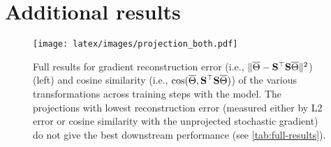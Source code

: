 \section{Additional results}
\begin{figure}[h]
    \centering
    \texttt{[image: latex/images/projection\_both.pdf]}
    \caption{Full results for gradient reconstruction error (i.e., $\Vert \overline{\Theta} - {\mathbf{S}}^\top {\mathbf{S}} \overline{\Theta}\Vert^2$) (left) and cosine similarity  (i.e., $\cos(\overline{\Theta}, {\mathbf{S}}^\top {\mathbf{S}} \overline{\Theta})$) of the various transformations across training steps with the \tinyB model. The projections with lowest reconstruction error (measured either by L2 error or cosine similarity with the unprojected stochastic gradient) do not give the best downstream performance (see \cref{tab:full-results}).}
    \label{fig:reconstruction_figure_full}
\end{figure}
